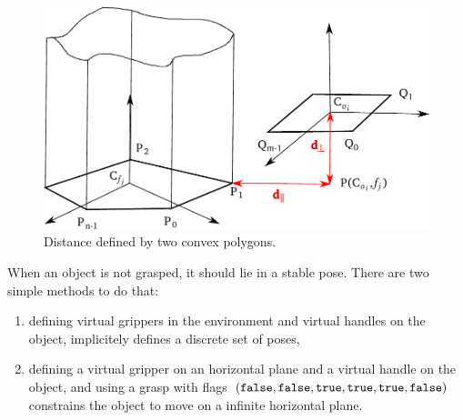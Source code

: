 \begin{figure}
  \begin{center}
    \includegraphics[width=\linewidth]{figures/convex-shape-contact.pdf}
  \end{center}
  \caption{Distance defined by two convex polygons.}
  \label{fig:convex-shape-contact}
\end{figure}

When an object is not grasped, it should lie in a stable pose. There are two simple methods to do that:
\begin{enumerate}
\item defining virtual grippers in the environment and virtual handles on the object, implicitely defines a discrete set of poses,
\item defining a virtual gripper on an horizontal plane and a virtual handle on the object, and using a grasp with flags $(\texttt{false},\texttt{false},\texttt{true},\texttt{true},\texttt{true},\texttt{false})$ constrains the object to move on a infinite horizontal plane.
\end{enumerate}

